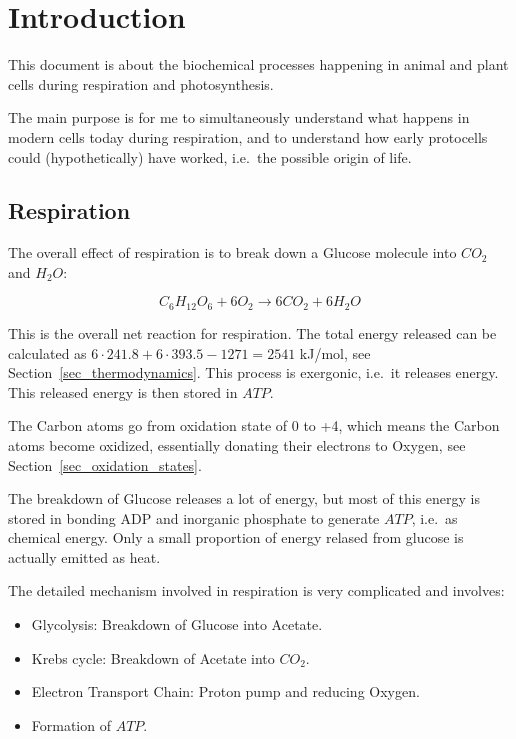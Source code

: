 \documentclass[a4paper,14pt]{extarticle}
\begin{document}

\section{Introduction}

This document is about the biochemical processes happening in animal and plant cells
during respiration and photosynthesis.

The main purpose is for me to simultaneously understand what happens in modern cells today
during respiration, and to understand how early protocells could (hypothetically) have
worked, i.e.\ the possible origin of life.

\subsection{Respiration}
The overall effect of respiration is to break down a Glucose molecule into $CO_2$ and
$H_2O$:

\[
    C_6H_{12}O_6 + 6O_2 \rightarrow 6CO_2 + 6H_2O
\]

This is the overall net reaction for respiration. The total energy released can be
calculated as $6\cdot 241.8 + 6\cdot 393.5 - 1271 = 2541$ kJ/mol, see
Section~\ref{sec_thermodynamics}.
This process is exergonic, i.e.\ it releases energy. This released energy is then stored
in $\mathit{ATP}$.

The Carbon atoms go from oxidation state of 0 to +4, which means the Carbon atoms become
oxidized, essentially donating their electrons to Oxygen, see
Section~\ref{sec_oxidation_states}.

The breakdown of Glucose releases a lot of energy, but most of this energy is stored in
bonding ADP and inorganic phosphate to generate $\mathit{ATP}$, i.e.\ as chemical energy.
Only a small proportion of energy relased from glucose is actually emitted as heat.

The detailed mechanism involved in respiration is very complicated and involves:
\begin{itemize}
    \item Glycolysis: Breakdown of Glucose into Acetate.
    \item Krebs cycle: Breakdown of Acetate into $CO_2$.
    \item Electron Transport Chain: Proton pump and reducing Oxygen.
    \item Formation of $\mathit{ATP}$.
\end{itemize}
\end{document}
